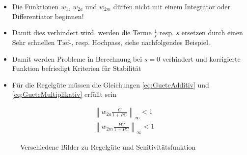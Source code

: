 \begin{itemize}
	\item Die Funktionen $w_1$, $w_{2a}$ und $w_{2m}$ dürfen nicht mit einem Integrator oder Differentiator beginnen!
	\item Damit dies verhindert wird, werden die Terme $\frac{1}{s}$ resp. $s$ ersetzen durch einen Sehr schnellen Tief-, resp. Hochpass, siehe nachfolgendes Beispiel.
	\item Damit werden Probleme in Berechnung bei $s=0$ verhindert und korrigierte Funktion befriedigt Kriterien für Stabilität
	\item Für die Regelgüte müssen die Gleichungen \ref{eq:GueteAdditiv} und \ref{eq:GueteMultiplikativ} erfüllt sein 
\end{itemize}
\begin{align}
	\label{eq:GueteAdditiv}
	\left\lVert w_{2a}  \frac{C}{1+PC}\right\rVert_\infty < 1\\
	\label{eq:GueteMultiplikativ}
	\left\lVert w_{2m} \frac{PC}{1+PC}\right\rVert_\infty<1
\end{align}

\begin{figure}[!h]
	\centering
	\quad
	\quad
	\caption{Verschiedene Bilder zu Regelgüte und Senitivitätsfunktion}
	\label{fig:hinf7}
\end{figure}

